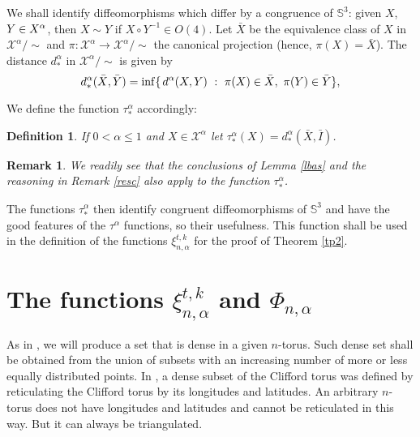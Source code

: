 \documentclass{article}
\def\S3{{\mathbb S^3}}
\newtheorem{definition}{Definition}[section]
\newtheorem{remark}{Remark}[section]
\begin{document}
\vspace{.2in}
 
 
We shall identify diffeomorphisms  which differ by a congruence of $\S3$: given $X$, $Y\in \mathcal \mathcal X^\alpha$, then $X\sim Y$ if $X\circ Y^{-1}\in O(4)$. Let $\bar X$ be the equivalence class of $X$ in $\mathcal X^\alpha/\sim$ and $\pi:\mathcal X^\alpha\to \mathcal X^\alpha/\sim$ the canonical projection (hence, $\pi(X)=\bar X$). 
The distance $d^\alpha_*$ in $\mathcal X^\alpha/\sim$ is given by 
\begin{equation}\label{edd}
d^\alpha_*(\bar X,\bar Y)=\inf\{\hspace{.02in}d^\alpha(X,Y)\ :\  \pi(X)\in \bar X,\ \pi(Y)\in \bar Y\},
\end{equation}

We define the function $\tau^\alpha_*$ accordingly: 
\begin{definition}
 If $0<\alpha\leq 1$ and $X\in\mathcal X^\alpha$ let
$\tau^\alpha_*(X)= d_*^\alpha(\bar X,\bar I)$. 
\end{definition}


\begin{remark}\label{rbas} We readily see that the conclusions of Lemma \ref{lbas} and the reasoning in  Remark \ref{resc} also apply to the function $\tau^\alpha_*$.
\end{remark}

The functions $\tau^\alpha_*$ then identify congruent diffeomorphisms of $\S3$ and have the good  features of the $\tau^\alpha$ functions, so their usefulness. This function shall be used in the  definition of the functions $\xi_{n,\alpha}^{t,k}$ for the proof of Theorem \ref{tp2}.


\section{ The functions $\xi_{n,\alpha}^{t,k}$ and $\Phi_{n,\alpha}$}\label{s2}





As in \cite{p1},
we will produce a set that is dense  in a given $n$-torus. Such dense set shall be obtained from the union of subsets  with an increasing number of more or less equally distributed points. In \cite{p1}, a dense subset of the Clifford  torus was defined  by  reticulating the Clifford torus by its longitudes and latitudes. An arbitrary $n$-torus does not have longitudes and latitudes and cannot be reticulated in this way. But it can always  be triangulated. 
\end{document}
